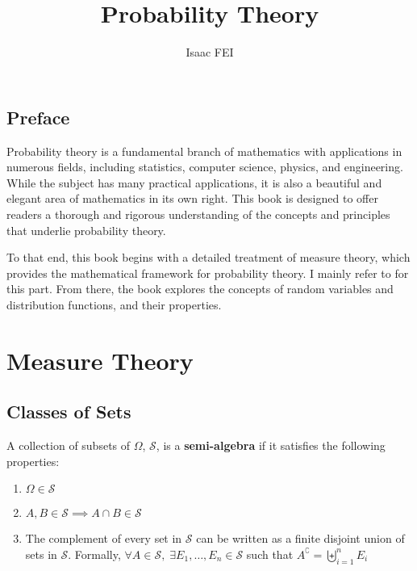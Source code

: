 \documentclass[thmcnt=section, 12pt, color=purple]{my-elegantbook}
\title{Probability Theory}
\author{Isaac FEI}
\begin{document}
\maketitle


\frontmatter
\section*{Preface}

Probability theory is a fundamental branch of mathematics 
with applications in numerous fields, 
including statistics, computer science, physics, and engineering. 
While the subject has many practical applications, 
it is also a beautiful and elegant area of mathematics in its own right. 
This book is designed to offer readers a thorough 
and rigorous understanding of the concepts 
and principles that underlie probability theory.

To that end, this book begins with a detailed treatment of measure theory, 
which provides the mathematical framework for probability theory. 
I mainly refer to \cite{taylorIntroductionMeasureIntegration1973}
for this part.
From there, the book explores the concepts of random variables
and distribution functions, and their properties. 


\tableofcontents
\mainmatter



\chapter{Measure Theory}


\section{Classes of Sets}


\begin{definition} \label{def:1}
	A collection of subsets of $\Omega$, $\mathcal{S}$, 
	is a \textbf{semi-algebra}
	if it satisfies the following properties:
	\begin{enumerate}
		\item $\Omega \in \mathcal{S}$
		\item $A, B \in \mathcal{S} \implies A \cap B \in \mathcal{S}$
		\item The complement of every set in $\mathcal{S}$ can be 
			written as a finite disjoint union 
			of sets in $\mathcal{S}$. 
			Formally, $\forall A \in \mathcal{S}, \; \exists E_1, \ldots, E_n \in \mathcal{S}$
			such that $A^\complement = \biguplus_{i=1}^n E_i$
	\end{enumerate}
\end{definition}
\end{document}

